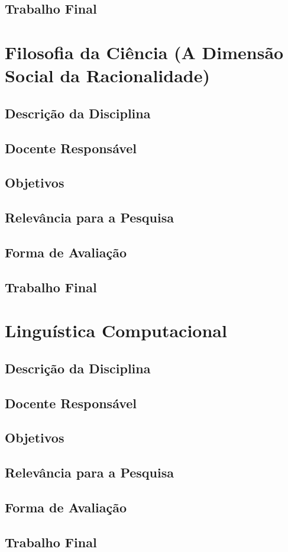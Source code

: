 \subsection{Trabalho Final}

\section{Filosofia da Ciência (A Dimensão Social da Racionalidade)}

\subsection{Descrição da Disciplina}
\subsection{Docente Responsável}
\subsection{Objetivos}
\subsection{Relevância para a Pesquisa}
\subsection{Forma de Avaliação}
\subsection{Trabalho Final}

\section{Linguística Computacional}
\subsection{Descrição da Disciplina}
\subsection{Docente Responsável}
\subsection{Objetivos}
\subsection{Relevância para a Pesquisa}
\subsection{Forma de Avaliação}
\subsection{Trabalho Final}